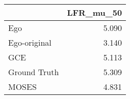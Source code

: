 \begin{tabular}{lr}
\toprule
{} & LFR_mu_50 \\
\midrule
Ego          &     5.090 \\
Ego-original &     3.140 \\
GCE          &     5.113 \\
Ground Truth &     5.309 \\
MOSES        &     4.831 \\
\bottomrule
\end{tabular}
